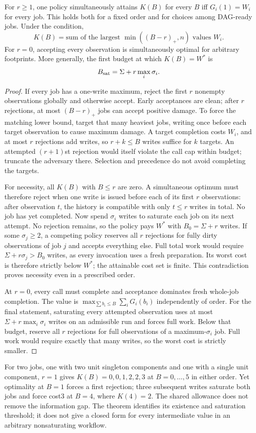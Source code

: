 \begin{theorem}
\label{thm:repairdag}
For $r\ge1$, one policy simultaneously attains $K(B)$ for every $B$ iff $G_i(1)=W_i$ for every job. This holds both for a fixed order and for choices among DAG-ready jobs. Under the condition,
\[
K(B)=\text{sum of the largest }\min((B-r)_+,n)\text{ values }W_i.
\]
For $r=0$, accepting every observation is simultaneously optimal for arbitrary footprints. More generally, the first budget at which $K(B)=W^*$ is
\[
B_{\rm sat}=\Sigma+r\max_i\sigma_i.
\]
\end{theorem}
\begin{proof}
If every job has a one-write maximum, reject the first $r$ nonempty observations globally and otherwise accept. Early acceptances are clean; after $r$ rejections, at most $(B-r)_+$ jobs can accept positive damage. To force the matching lower bound, target that many heaviest jobs, writing once before each target observation to cause maximum damage. A target completion costs $W_i$, and at most $r$ rejections add writes, so $r+k\le B$ writes suffice for $k$ targets. An attempted $(r+1)$st rejection would itself violate the call cap within budget; truncate the adversary there. Selection and precedence do not avoid completing the targets.

For necessity, all $K(B)$ with $B\le r$ are zero. A simultaneous optimum must therefore reject when one write is issued before each of its first $r$ observations: after observation $t$, the history is compatible with only $t\le r$ writes in total. No job has yet completed. Now spend $\sigma_i$ writes to saturate each job on its next attempt. No rejection remains, so the policy pays $W^*$ with $B_0=\Sigma+r$ writes. If some $\sigma_j\ge2$, a competing policy reserves all $r$ rejections for fully dirty observations of job $j$ and accepts everything else. Full total work would require $\Sigma+r\sigma_j>B_0$ writes, as every invocation uses a fresh preparation. Its worst cost is therefore strictly below $W^*$; the attainable cost set is finite. This contradiction proves necessity even in a prescribed order.

At $r=0$, every call must complete and acceptance dominates fresh whole-job completion. The value is $\max_{\sum b_i\le B}\sum_iG_i(b_i)$ independently of order. For the final statement, saturating every attempted observation uses at most $\Sigma+r\max_i\sigma_i$ writes on an admissible run and forces full work. Below that budget, reserve all $r$ rejections for full observations of a maximum-$\sigma_i$ job. Full work would require exactly that many writes, so the worst cost is strictly smaller.
\end{proof}

For two jobs, one with two unit singleton components and one with a single unit component, $r=1$ gives $K(B)=0,0,1,2,2,3$ at $B=0,\ldots,5$ in either order. Yet optimality at $B=1$ forces a first rejection; three subsequent writes saturate both jobs and force cost3 at $B=4$, where $K(4)=2$. The shared allowance does not remove the information gap. The theorem identifies its existence and saturation threshold; it does not give a closed form for every intermediate value in an arbitrary nonsaturating workflow.

